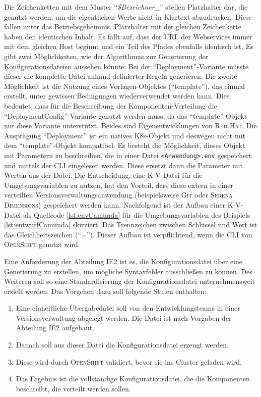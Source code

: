 Die Zeichenketten mit dem Muster \enquote{\textit{\$Bezeichner\_}} stellen Platzhalter dar, die genutzt werden, um die eigentlichen Werte nicht in Klartext abzudrucken. Diese fallen unter das Betriebsgeheimnis. Platzhalter mit der gleichen Zeichenkette haben den identischen Inhalt. Es fällt auf, dass der \ac{URL} der Webservices immer mit dem gleichen Host beginnt und ein Teil des Pfades ebenfalls identisch ist. Es gibt zwei Möglichkeiten, wie der Algorithmus zur Generierung der Konfigurationsdateien aussehen könnte: Bei der \enquote{Deployment}-Variante müsste dieser die komplette Datei anhand definierter Regeln generieren. Die zweite Möglichkeit ist die Nutzung eines Vorlagen-Objektes (\enquote{template}), das einmal erstellt, unter gewissen Bedingungen wiederverwendet werden kann. Dies bedeutet, dass für die Beschreibung der Komponenten-Verteilung die \enquote{DeploymentConfig}-Variante genutzt werden muss, da das \enquote{template}-Objekt nur diese Variante unterstützt. Beides sind Eigenentwicklungen von \textsc{Red Hat}. Die Ausprägung \enquote{Deployment} ist ein natives \ac{K8s}-Objekt und deswegen nicht mit dem \enquote{template}-Objekt kompatibel. Es besteht die Möglichkeit, dieses Objekt mit Parametern zu beschreiben, die in einer Datei \lstinline|<Anwendung>.env| gespeichert und mittels der \ac{CLI} eingelesen werden. Diese ersetzt dann die Parameter mit Werten aus der Datei. Die Entscheidung, eine \ac{K-V}-Datei für die Umgebungsvariablen zu nutzen, hat den Vorteil, dass diese extern in einer verteilten Versionsverwaltungsanwendung (beispielsweise \textsc{Git} oder \textsc{Serena Dimensions}) gespeichert werden kann. Nachfolgend ist der Aufbau einer \ac{K-V}-Datei als Quellcode \vref{lst:envCamunda} für die Umgebungsvariablen des Beispiels \vref{lst:entwurfCamunda} skizziert. Das Trennzeichen zwischen Schlüssel und Wert ist das Gleichheitszeichen (\enquote{=}). Dieser Aufbau ist verpflichtend, wenn die \ac{CLI} von \textsc{OpenShift} genutzt wird.



Eine Anforderung der Abteilung \ac{IE2} ist es, die Konfigurationsdatei über eine Generierung zu erstellen, um mögliche Syntaxfehler ausschließen zu können. Des Weiteren soll so eine Standardisierung der Konfigurationsdatei unternehmensweit erzielt werden. Das Vorgehen dazu soll folgende Stufen enthalten: 


\begin{enumerate}
	\item Eine einheitliche Übergabedatei soll von den Entwicklungsteams in einer Versionsverwaltung abgelegt werden. Die Datei ist nach Vorgaben der Abteilung \ac{IE2} aufgebaut.
	\item Danach soll aus dieser Datei die Konfigurationsdatei erzeugt werden.
	\item Diese wird durch \textsc{OpenShift} validiert, bevor sie ins Cluster geladen wird.
	\item Das Ergebnis ist die vollständige Konfigurationsdatei, die die Komponenten beschreibt, die verteilt werden sollen.
\end{enumerate}

